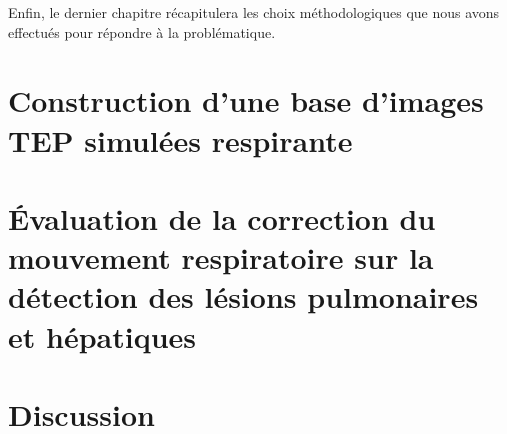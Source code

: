 \documentclass[12pt, twoside, a4paper]{book}
\begin{document}
Enfin, le dernier chapitre récapitulera les choix méthodologiques que nous avons effectués pour répondre à la problématique.

	
	

\part{Construction d'une base d'images TEP simulées respirante}
	
	

\part{\'Evaluation de la correction du mouvement respiratoire sur la détection des lésions pulmonaires et hépatiques}
	

\part{Discussion}
	


\newpage
{}





\newpage



\newpage

\newpage

\end{document}
